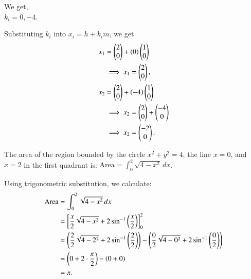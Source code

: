 \documentclass[journal]{IEEEtran}
\begin{document}
We get,\\
$k_i = 0, -4$.

Substituting $k_i$ into $x_i = h + k_i m$, we get\\

\begin{align}
x_1 &= \begin{pmatrix}2 \\ 0\end{pmatrix} + \left(0\right) \begin{pmatrix}1 \\ 0\end{pmatrix} \\
&\implies x_1 = \begin{pmatrix}2 \\ 0\end{pmatrix}, \\
x_2 &= \begin{pmatrix}2 \\ 0\end{pmatrix} + \left(-4\right) \begin{pmatrix}1 \\ 0\end{pmatrix} \\
&\implies x_2 = \begin{pmatrix}2 \\ 0\end{pmatrix} + \begin{pmatrix}-4 \\ 0\end{pmatrix} \\
&\implies x_2 = \begin{pmatrix}-2 \\ 0\end{pmatrix}.
\end{align}

The area of the region bounded by the circle $x^2 + y^2 = 4$, the line $x = 0$, and $x = 2$ in the first quadrant is:
$\text{Area} = \int_0^2 \sqrt{4 - x^2} \, dx$.

Using trigonometric substitution, we calculate:
\begin{align}
\text{Area} &= \int_0^2 \sqrt{4 - x^2} \, dx \\
&= \left[\frac{x}{2} \sqrt{4 - x^2} + 2 \sin^{-1}\left(\frac{x}{2}\right)\right]_0^2 \\
&= \left(\frac{2}{2} \sqrt{4 - 2^2} + 2 \sin^{-1}\left(\frac{2}{2}\right)\right) - \left(\frac{0}{2} \sqrt{4 - 0^2} + 2 \sin^{-1}\left(\frac{0}{2}\right)\right) \\
&= \left(0 + 2 \cdot \frac{\pi}{2}\right) - \left(0 + 0\right) \\
&= \pi.
\end{align}
\end{document}

